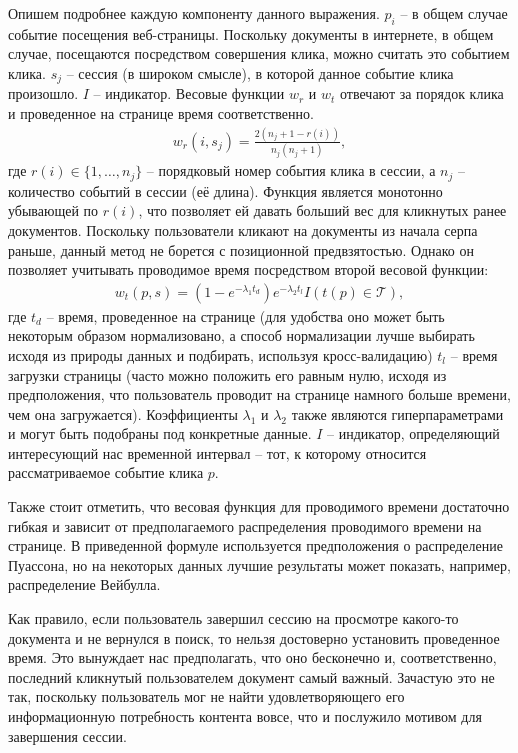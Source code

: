 \documentclass[diploma]{nanolab2015}
\begin{document}
Опишем подробнее каждую компоненту данного выражения. $p_i$ -- в общем случае событие посещения веб-страницы. Поскольку документы в интернете, в общем случае, посещаются посредством совершения клика, можно считать это событием клика. $s_j$ -- сессия (в широком смысле), в которой данное событие клика произошло. $I$ -- индикатор. Весовые функции $w_r$ и $w_t$ отвечают за порядок клика и проведенное на странице время соответственно.
\begin{align}
    w_r(i, s_j) = \frac{2(n_j + 1 - r(i))}{n_j(n_j + 1)},
\end{align}
где $r(i) \in \{1, \dots, n_j\}$ -- порядковый номер события клика в сессии, а $n_j$ -- количество событий в сессии (её длина). Функция является монотонно убывающей по $r(i)$, что позволяет ей давать больший вес для кликнутых ранее документов. Поскольку пользователи кликают на документы из начала серпа раньше, данный метод не борется с позиционной предвзятостью. Однако он позволяет учитывать проводимое время посредством второй весовой функции:
\begin{align}
    w_t(p, s) = (1 - e^{-\lambda_1 t_d})e^{-\lambda_2 t_l} I(t(p) \in \mathcal{T}),
\end{align}
где $t_d$ -- время, проведенное на странице (для удобства оно может быть некоторым образом нормализовано, а способ нормализации лучше выбирать исходя из природы данных и подбирать, используя кросс-валидацию) $t_l$ -- время загрузки страницы (часто можно положить его равным нулю, исходя из предположения, что пользователь проводит на странице намного больше времени, чем она загружается). Коэффициенты $\lambda_1$ и $\lambda_2$ также являются гиперпараметрами и могут быть подобраны под конкретные данные. $I$ -- индикатор, определяющий интересующий нас временной интервал -- тот, к которому относится рассматриваемое событие клика $p$.

Также стоит отметить, что весовая функция для проводимого времени достаточно гибкая и зависит от предполагаемого распределения проводимого времени на странице. В приведенной формуле используется предположения о распределение Пуассона, но на некоторых данных лучшие результаты может показать, например, распределение Вейбулла.

Как правило, если пользователь завершил сессию на просмотре какого-то документа и не вернулся в поиск, то нельзя достоверно установить проведенное время. Это вынуждает нас предполагать, что оно бесконечно и, соответственно, последний кликнутый пользователем документ самый важный. Зачастую это не так, поскольку пользователь мог не найти удовлетворяющего его информационную потребность контента вовсе, что и послужило мотивом для завершения сессии.
\end{document}
